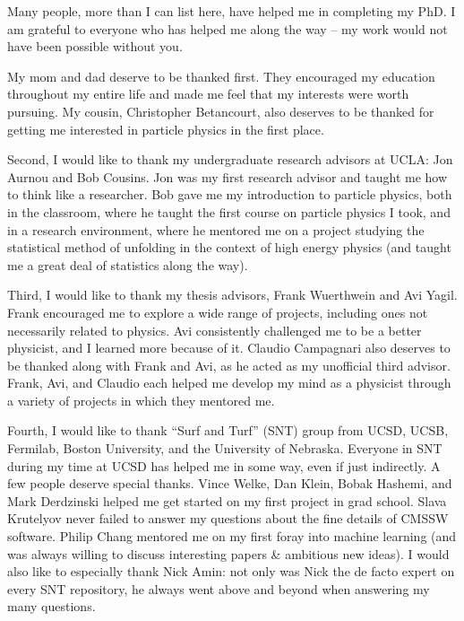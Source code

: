 \begin{frontmatter}
%
%
\begin{acknowledgements}
    Many people, more than I can list here, have helped me in completing my PhD.
    I am grateful to everyone who has helped me along the way -- my work would not have been possible without you.

    My mom and dad deserve to be thanked first. They encouraged my education throughout my entire life and made me feel that my interests were worth pursuing.
    My cousin, Christopher Betancourt, also deserves to be thanked for getting me interested in particle physics in the first place.

    Second, I would like to thank my undergraduate research advisors at UCLA: Jon Aurnou and Bob Cousins.
    Jon was my first research advisor and taught me how to think like a researcher.
    Bob gave me my introduction to particle physics, both in the classroom, where he taught the first course on particle physics I took, and in a research environment, where he mentored me on a project studying the statistical method of unfolding in the context of high energy physics (and taught me a great deal of statistics along the way).
    
    Third, I would like to thank my thesis advisors, Frank Wuerthwein and Avi Yagil.
    Frank encouraged me to explore a wide range of projects, including ones not necessarily related to physics.
    Avi consistently challenged me to be a better physicist, and I learned more because of it. 
    Claudio Campagnari also deserves to be thanked along with Frank and Avi, as he acted as my unofficial third advisor.
    Frank, Avi, and Claudio each helped me develop my mind as a physicist through a variety of projects in which they mentored me.

    Fourth, I would like to thank ``Surf and Turf'' (SNT) group from UCSD, UCSB, Fermilab, Boston University, and the University of Nebraska.
    Everyone in SNT during my time at UCSD has helped me in some way, even if just indirectly.
    A few people deserve special thanks. 
    Vince Welke, Dan Klein, Bobak Hashemi, and Mark Derdzinski helped me get started on my first project in grad school.
    Slava Krutelyov never failed to answer my questions about the fine details of CMSSW software.
    Philip Chang mentored me on my first foray into machine learning (and was always willing to discuss interesting papers \& ambitious new ideas).
    I would also like to especially thank Nick Amin: not only was Nick the de facto expert on every SNT repository, he always went above and beyond when answering my many questions. 


\end{acknowledgements}
\end{frontmatter}
